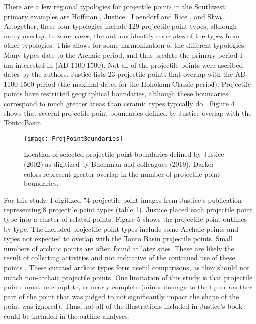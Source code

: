 \documentclass[PCJ,Unicode,screen,mode=plain]{cedram}
\begin{document}
There are a few regional typologies for projectile points in the Southwest: primary examples are Hoffman \autocite*{Hoffman1997-hb}, Justice \autocite*{Justice2002-cf}, Loendorf and Rice \autocite*{Loendorf2004-tp}, and Sliva \autocite*{Sliva2006-nq}. Altogether, these four typologies include 129 projectile point types, although many overlap. In some cases, the authors identify correlates of the types from other typologies. This allows for some harmonization of the different typologies. Many types date to the Archaic period, and thus predate the primary period I am interested in (AD 1100-1500). Not all of the projectile points were ascribed dates by the authors. Justice lists 23 projectile points that overlap with the AD 1100-1500 period (the maximal dates for the Hohokam Classic period). Projectile points have restricted geographical boundaries, although these boundaries correspond to much greater areas than ceramic types typically do \autocite{Buchanan2019-vn}. Figure 4 shows that several projectile point boundaries defined by Justice overlap with the Tonto Basin.

\begin{figure}
\texttt{[image: ProjPointBoundaries]} \caption{Location of selected projectile point boundaries defined by Justice (2002) as digitized by Buchanan and colleagues (2019). Darker colors represent greater overlap in the number of projectile point boundaries.}\label{fig:ProjectilePointBoundaries}
\end{figure}

For this study, I digitized 74 projectile point images from Justice's publication representing 8 projectile point types (table 1). Justice placed each projectile point type into a cluster of related points. Figure 5 shows the projectile point outlines by type. The included projectile point types include some Archaic points and types not expected to overlap with the Tonto Basin projectile points. Small numbers of archaic points are often found at later sites. These are likely the result of collecting activities and not indicative of the continued use of these points \autocite[see][ for numerous examples]{Justice2002-cf}. These curated archaic types form useful comparisons, as they should not match non-archaic projectile points. One limitation of this study is that projectile points must be complete, or nearly complete (minor damage to the tip or another part of the point that was judged to not significantly impact the shape of the point was ignored). Thus, not all of the illustrations included in Justice's book could be included in the outline analyses.
\end{document}
